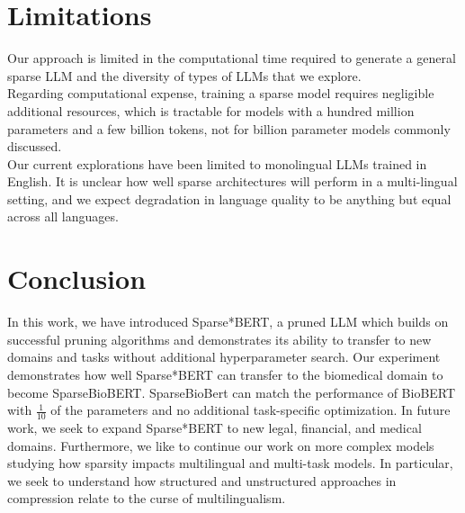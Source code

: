 \documentclass[10pt]{article}
\begin{document}
\section{Limitations}
Our approach is limited in the computational time required to generate a general sparse LLM and the diversity of types of LLMs that we explore. \\
Regarding computational expense, training a sparse model requires negligible additional resources, which is tractable for models with a hundred million parameters and a few billion tokens, not for billion parameter models commonly discussed. \\
Our current explorations have been limited to monolingual LLMs trained in English. It is unclear how well sparse architectures will perform in a multi-lingual setting, and we expect degradation in language quality to be anything but equal across all languages. \\
\section{Conclusion}
In this work, we have introduced Sparse*BERT, a pruned LLM which builds on successful pruning algorithms and demonstrates its ability to transfer to new domains and tasks without additional hyperparameter search. Our experiment demonstrates how well Sparse*BERT can transfer to the biomedical domain to become SparseBioBERT. SparseBioBert can match the performance of BioBERT with $\frac{1}{10}$ of the parameters and no additional task-specific optimization. 
In future work, we seek to expand Sparse*BERT to new legal, financial, and medical domains. Furthermore, we like to continue our work on more complex models studying how sparsity impacts multilingual and multi-task models. In particular, we seek to understand how structured and unstructured approaches in compression relate to the curse of multilingualism.


\end{document}
